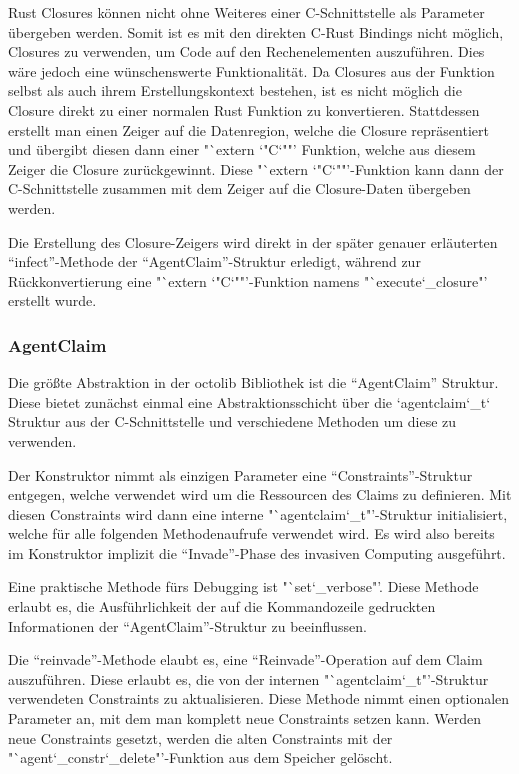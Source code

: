 Rust Closures können nicht ohne Weiteres einer C-Schnittstelle als Parameter übergeben werden. Somit ist es mit den direkten
C-Rust Bindings nicht möglich, Closures zu verwenden, um Code auf den Rechenelementen auszuführen. Dies wäre jedoch eine
wünschenswerte Funktionalität. Da Closures aus der Funktion selbst als auch ihrem Erstellungskontext\cite{closureWikiDe}
bestehen, ist es nicht möglich die Closure direkt zu einer normalen Rust Funktion zu konvertieren. Stattdessen erstellt
man einen Zeiger auf die Datenregion, welche die Closure repräsentiert und übergibt diesen dann einer
"`extern \char`"C\char`""' Funktion, welche aus diesem Zeiger die Closure zurückgewinnt.
Diese "`extern \char`"C\char`""'-Funktion kann dann der C-Schnittstelle zusammen mit dem Zeiger
auf die Closure-Daten übergeben werden.

Die Erstellung des Closure-Zeigers wird direkt in der später genauer erläuterten "`infect"'-Methode der "`AgentClaim"'-Struktur
erledigt, während zur Rückkonvertierung eine "`extern \char`"C\char`""'-Funktion namens "`execute\char`_closure"' erstellt wurde.

\subsubsection{AgentClaim}

Die größte Abstraktion in der octolib Bibliothek ist die "`AgentClaim"' Struktur. Diese bietet zunächst einmal eine Abstraktionsschicht
über die `agentclaim\char`_t` Struktur aus der C-Schnittstelle und verschiedene Methoden um diese zu verwenden.

Der Konstruktor nimmt als einzigen Parameter eine "`Constraints"'-Struktur entgegen, welche verwendet wird um die
Ressourcen des Claims zu definieren. Mit diesen Constraints wird dann eine interne "`agentclaim\char`_t"'-Struktur initialisiert,
welche für alle folgenden Methodenaufrufe verwendet wird. Es wird also bereits im Konstruktor implizit die
"`Invade"'-Phase des invasiven Computing ausgeführt.

Eine praktische Methode fürs Debugging ist "`set\char`_verbose"'. Diese Methode erlaubt es, die Ausführlichkeit der auf
die Kommandozeile gedruckten Informationen der "`AgentClaim"'-Struktur zu beeinflussen.

Die "`reinvade"'-Methode elaubt es, eine "`Reinvade"'-Operation auf dem Claim auszuführen. Diese erlaubt es,
die von der internen "`agentclaim\char`_t"'-Struktur verwendeten Constraints zu aktualisieren.  Diese Methode nimmt einen
optionalen Parameter an, mit dem man komplett neue Constraints setzen kann.
Werden neue Constraints gesetzt, werden die alten Constraints mit der "`agent\char`_constr\char`_delete"'-Funktion aus dem Speicher
gelöscht. 

